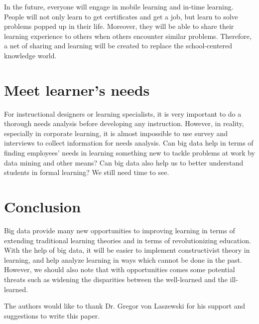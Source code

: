 \documentclass[sigconf]{acmart}
\begin{document}
In the future, everyone will engage in mobile learning and in-time learning. People will not only learn to get certificates and get a job, but learn to solve problems popped up in their life. Moreover, they will be able to share their learning experience to others when others encounter similar problems. Therefore, a net of sharing and learning will be created to replace the school-centered knowledge world.

\section{Meet learner's needs}
For instructional designers or learning specialists, it is very important to do a thorough needs analysis before developing any instruction. However, in reality, especially in corporate learning, it is almost impossible to use survey and interviews to collect information for needs analysis. Can big data help in terms of finding employees' needs in learning something new to tackle problems at work by data mining and other means? Can big data also help us to better understand students in formal learning? We still need time to see.

\section{Conclusion}

Big data provide many new opportunities to improving learning in terms of extending traditional learning theories and in terms of revolutionizing education. With the help of big data, it will be easier to implement constructivist theory in learning, and help analyze learning in ways which cannot be done in the past. However, we should also note that with opportunities comes some potential threats such as widening the disparities between the well-learned and the ill-learned.


\begin{acks}

  The authors would like to thank Dr. Gregor von Laszewski for his
  support and suggestions to write this paper.

\end{acks}


 
\end{document}
